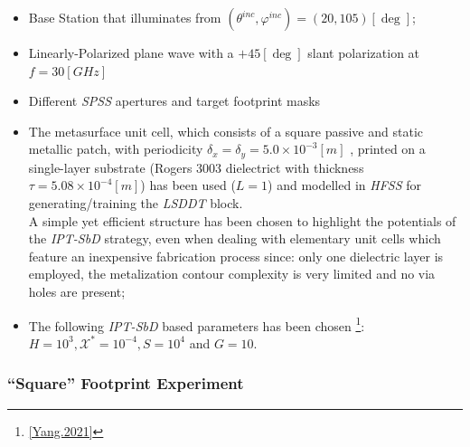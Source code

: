 \begin{itemize}
\item Base Station that illuminates from $(\theta^{inc},\varphi^{inc})=(20,105)[\deg]$;
\item Linearly-Polarized plane wave with a $+45[\deg]$ slant polarization
at $f=30[GHz]$
\item Different \emph{SPSS} apertures and target footprint masks
\item The metasurface unit cell, which consists of a square passive and
static metallic patch, with periodicity $\delta_{x}=\delta_{y}=5.0\times10^{-3}[m]$
, printed on a single-layer substrate (Rogers 3003 dielectrict with
thickness $\tau=5.08\times10^{-4}[m]$) has been used ($L=1$) and
modelled in \emph{HFSS} for generating/training the \emph{LSDDT} block.\\
A simple yet efficient structure has been chosen to highlight the
potentials of the \emph{IPT-SbD} strategy, even when dealing with
elementary unit cells which feature an inexpensive fabrication process
since: only one dielectric layer is employed, the metalization contour
complexity is very limited and no via holes are present;
\item The following \emph{IPT-SbD} based parameters has been chosen %
\footnote{\ref{Yang.2021}%
}{\let\thefootnote\relax{}}:
$H=10^{3},\mathcal{X}^{*}=10^{-4},S=10^{4}$ and $G=10$.
\end{itemize}

\subsubsection{{}``Square'' Footprint Experiment}

